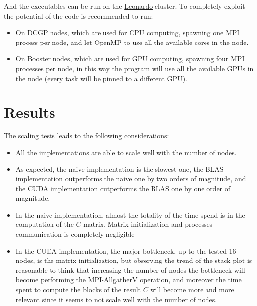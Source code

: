 \documentclass{article}
\begin{document}
    And the executables can be run on the \href{https://leonardo-supercomputer.cineca.eu/}{Leonardo} cluster.
    To completely exploit the potential of the code is recommended to run:
    
    \begin{itemize}
        \itemsep0em
        \item On \href{https://wiki.u-gov.it/confluence/display/SCAIUS/UG3.2.2%3A+LEONARDO+DCGP+UserGuide}{DCGP} nodes, which are used for CPU computing,
             spawning one MPI process per node, and let OpenMP to use all the available cores in the node.
        \item On \href{https://wiki.u-gov.it/confluence/display/SCAIUS/UG3.2.1%3A+LEONARDO+Booster+UserGuide}{Booster} nodes, which are used for GPU computing,
             spawning four MPI processes per node, in this way the program will use all the available GPUs in the node (every task will be pinned to a different GPU).
    \end{itemize}


    \section{Results}

    The scaling tests leads to the following considerations:

    \begin{itemize}
        \itemsep0em
        \item All the implementations are able to scale well with the number of nodes.
        \item As expected, the naive implementation is the slowest one, the BLAS implementation outperforms the naive one by two orders of magnitude,
            and the CUDA implementation outperforms the BLAS one by one order of magnitude.
        \item In the naive implementation, almost the totality of the time spend is in the computation of the $C$ matrix.
            Matrix initialization and processes communication is completely negligible
        \item In the CUDA implementation, the major bottleneck, up to the tested 16 nodes, is the matrix initialization, but observing the
            trend of the stack plot is reasonable to think that increasing the number of nodes the bottleneck will become performing the MPI-AllgatherV operation,
            and moreover the time spent to compute the blocks of the result $C$  will become more and more relevant since it seems to not scale well with the number of nodes.
    \end{itemize}
\end{document}
